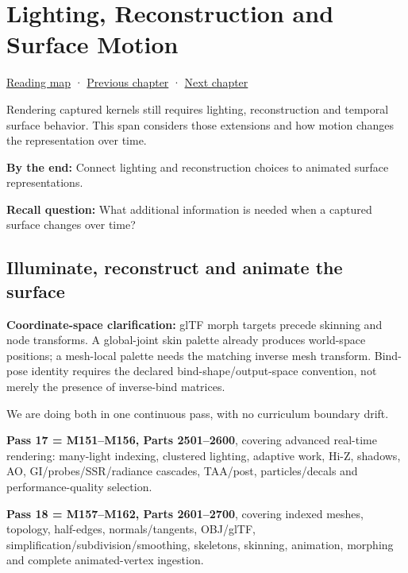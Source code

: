 \chapter{Lighting, Reconstruction and Surface Motion}\label{04-visual-computing-ii-ch040-lighting-reconstruction-and-surface-motion}\hypertarget{04-visual-computing-ii-ch040}{}\label{stagechapter:04-visual-computing-ii-ch040}

\hypertarget{04-visual-computing-ii-ch040-lighting-reconstruction-and-surface-motion}{}

\hyperref[volume-reading-map]{Reading map} · \hyperref[04-visual-computing-ii-ch035]{Previous chapter} · \hyperref[06-engine-ii-ch032]{Next chapter}

Rendering captured kernels still requires lighting, reconstruction and temporal surface behavior. This span considers those extensions and how motion changes the representation over time.

\textbf{By the end:} Connect lighting and reconstruction choices to animated surface representations.

\textbf{Recall question:} What additional information is needed when a captured surface changes over time?

\section{Illuminate, reconstruct and animate the surface}\label{04-visual-computing-ii-ch040-illuminate-reconstruct-and-animate-the-surface}

\hypertarget{04-visual-computing-ii-ch040-illuminate-reconstruct-and-animate-the-surface}{}

\textbf{Coordinate-space clarification:} glTF morph targets precede skinning and node transforms. A global-joint skin palette already produces world-space positions; a mesh-local palette needs the matching inverse mesh transform. Bind-pose identity requires the declared bind-shape/output-space convention, not merely the presence of inverse-bind matrices.

We are doing both in one continuous pass, with no curriculum boundary drift.

\textbf{Pass 17 = M151--M156, Parts 2501--2600}, covering advanced real-time rendering: many-light indexing, clustered lighting, adaptive work, Hi-Z, shadows, AO, GI/probes/SSR/radiance cascades, TAA/post, particles/decals and performance-quality selection.

\textbf{Pass 18 = M157--M162, Parts 2601--2700}, covering indexed meshes, topology, half-edges, normals/tangents, OBJ/glTF, simplification/subdivision/smoothing, skeletons, skinning, animation, morphing and complete animated-vertex ingestion.

